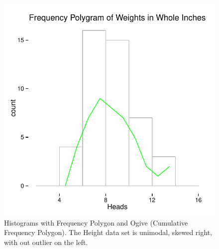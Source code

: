 \documentclass[nohyper,justified]{tufte-handout}\usepackage[]{graphicx}\usepackage[]{color}
\makeatletter
\def\maxwidth{ %
  \ifdim\Gin@nat@width>\linewidth
    \linewidth
  \else
    \Gin@nat@width
  \fi
}
\newenvironment{knitrout}{}{} %
\makeatother
\begin{document}
\begin{knitrout}
\begin{figure}
{\centering \includegraphics[width=\maxwidth]{figure/graphics-histogram2bin-2} 

}

\caption[Histograms with Frequency Polygon and Ogive (Cumulative Frequency Polygon)]{Histograms with Frequency Polygon and Ogive (Cumulative Frequency Polygon). The Height data set is unimodal, skewed right, with out outlier on the left. }\label{fig:histogram2bin2}
\end{figure}


\end{knitrout}
\end{document}

